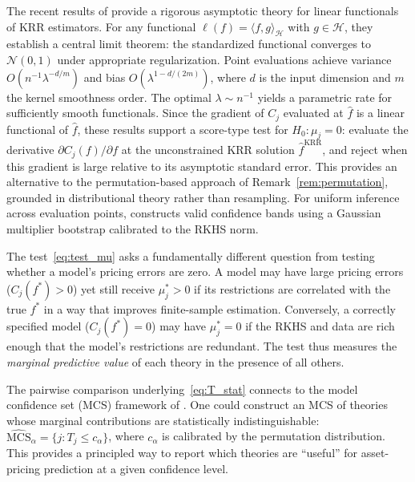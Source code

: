 \begin{remark}
\label{rem:fischer_steinwart}
The recent results of \citet{fischer2024asymptotic} provide a rigorous
asymptotic theory for linear functionals of KRR estimators.
For any functional $\ell(f) = \langle f, g \rangle_{\mathcal{H}}$
with $g \in \mathcal{H}$, they establish a central limit theorem:
the standardized functional converges to $\mathcal{N}(0,1)$ under
appropriate regularization.
Point evaluations achieve variance $O(n^{-1}\lambda^{-d/m})$ and
bias $O(\lambda^{1-d/(2m)})$, where $d$ is the input dimension and
$m$ the kernel smoothness order.
The optimal $\lambda \sim n^{-1}$ yields a parametric rate for
sufficiently smooth functionals.
Since the gradient of $C_j$ evaluated at $\hat{f}$ is a linear
functional of $\hat{f}$, these results support a score-type test
for $H_0: \mu_j = 0$: evaluate the derivative
$\partial C_j(f)/\partial f$ at the unconstrained KRR solution
$\hat{f}^{\mathrm{KRR}}$, and reject when this gradient is large
relative to its asymptotic standard error.
This provides an alternative to the permutation-based approach
of Remark~\ref{rem:permutation}, grounded in distributional theory
rather than resampling.
For uniform inference across evaluation points,
\citet{singh2024kernel} constructs valid confidence bands
using a Gaussian multiplier bootstrap calibrated to the RKHS norm.
\end{remark}

\begin{remark}[Interpretation]
\label{rem:test_interpretation}
The test~\eqref{eq:test_mu} asks a fundamentally different question
from testing whether a model's pricing errors are zero.
A model may have large pricing errors ($C_j(f^*) > 0$) yet still
receive $\mu_j^* > 0$ if its restrictions are correlated with the
true $f^*$ in a way that improves finite-sample estimation.
Conversely, a correctly specified model ($C_j(f^*) = 0$) may have
$\mu_j^* = 0$ if the RKHS and data are rich enough that the model's
restrictions are redundant.
The test thus measures the \emph{marginal predictive value} of each
theory in the presence of all others.
\end{remark}

\begin{remark}
\label{rem:mcs}
The pairwise comparison underlying~\eqref{eq:T_stat} connects to
the model confidence set (MCS) framework of
\citet*{HansenLundeNason2011}.
One could construct an MCS of theories whose marginal contributions
are statistically indistinguishable:
$\widehat{\mathrm{MCS}}_\alpha = \{j : T_j \leq c_\alpha\}$,
where $c_\alpha$ is calibrated by the permutation distribution.
This provides a principled way to report which theories are
``useful'' for asset-pricing prediction at a given confidence level.
\end{remark}

